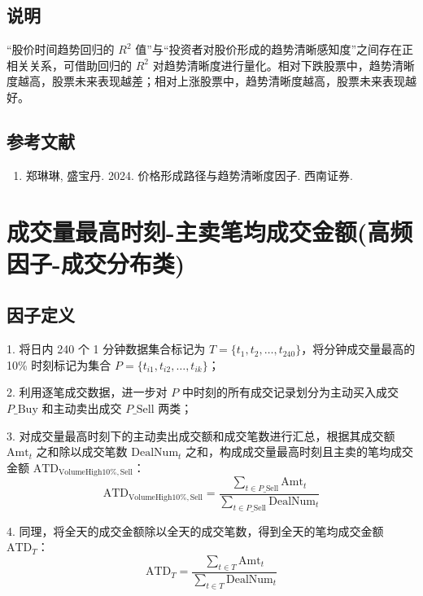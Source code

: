 \documentclass{article}
\begin{document}
\subsection{说明}
“股价时间趋势回归的 \( R^2 \) 值”与“投资者对股价形成的趋势清晰感知度”之间存在正相关关系，可借助回归的 \( R^2 \) 对趋势清晰度进行量化。相对下跌股票中，趋势清晰度越高，股票未来表现越差；相对上涨股票中，趋势清晰度越高，股票未来表现越好。

\subsection{参考文献}
\begin{enumerate}
    \item 郑琳琳, 盛宝丹. 2024. 价格形成路径与趋势清晰度因子. 西南证券.
\end{enumerate}

\section{成交量最高时刻-主卖笔均成交金额(高频因子-成交分布类)}

\subsection{因子定义}

1. 将日内 240 个 1 分钟数据集合标记为 \( T = \{t_1, t_2, \dots, t_{240}\} \)，将分钟成交量最高的 10\% 时刻标记为集合 \( P = \{t_{i1}, t_{i2}, \dots, t_{ik}\} \)；

2. 利用逐笔成交数据，进一步对 \( P \) 中时刻的所有成交记录划分为主动买入成交 \( P\_\mathrm{Buy} \) 和主动卖出成交 \( P\_\mathrm{Sell} \) 两类；

3. 对成交量最高时刻下的主动卖出成交额和成交笔数进行汇总，根据其成交额 \( \mathrm{Amt}_t \) 之和除以成交笔数 \( \mathrm{DealNum}_t \) 之和，构成成交量最高时刻且主卖的笔均成交金额 \( \mathrm{ATD}_{\mathrm{VolumeHigh10\%,Sell}} \)：
\begin{equation}
    \mathrm{ATD}_{\mathrm{VolumeHigh10\%,Sell}} = \frac{\sum_{t \in P\_\mathrm{Sell}} \mathrm{Amt}_t}{\sum_{t \in P\_\mathrm{Sell}} \mathrm{DealNum}_t}
\end{equation}

4. 同理，将全天的成交金额除以全天的成交笔数，得到全天的笔均成交金额 \( \mathrm{ATD}_T \)：
\begin{equation}
    \mathrm{ATD}_T = \frac{\sum_{t \in T} \mathrm{Amt}_t}{\sum_{t \in T} \mathrm{DealNum}_t}
\end{equation}
\end{document}
